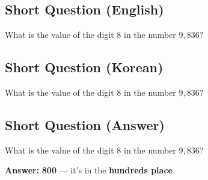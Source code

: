 \cleardoublepage
\subsection*{Short Question (English)}
What is the value of the digit $8$ in the number $9{,}836$?


\newpage
\subsection*{Short Question (Korean)}
What is the value of the digit $8$ in the number $9{,}836$?


\newpage
\subsection*{Short Question (Answer)}
What is the value of the digit $8$ in the number $9{,}836$?

\textbf{Answer:} \textbf{800} — it's in the \textbf{hundreds place}.
